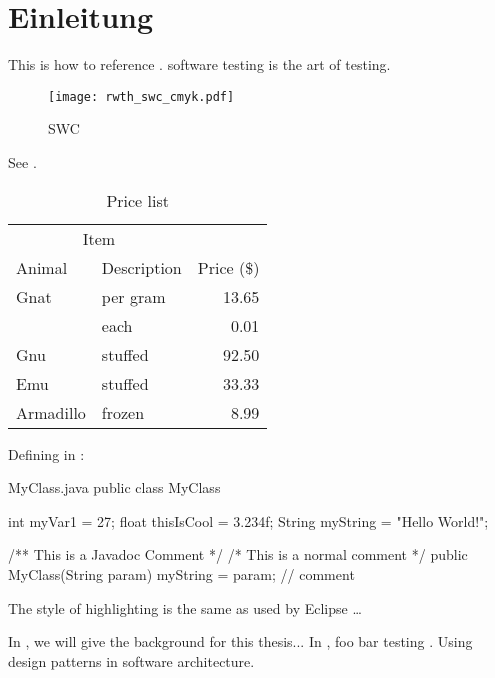 
\chapter{Einleitung} \label{chap:Einleitung}
\minitoc\vspace{1em}
\blindtext

 This is how to reference . \gls{software testing} is the art of \gls{testing}.

\blindtext

\begin{figure}[ht]
  \centering
    \texttt{[image: rwth\_swc\_cmyk.pdf]}
  \caption{SWC} \label{fig:SWC}
\end{figure}

\Blindtext See . 

\begin{table}
  \begin{center}
    \begin{tabular}{llr}
      \toprule
      \multicolumn{2}{c}{Item} \\
      \cmidrule(r){1-2}
      Animal & Description & Price (\$) \\
      \midrule
      Gnat      & per gram & 13.65 \\
                & each     &  0.01 \\
      Gnu       & stuffed  & 92.50 \\
      Emu       & stuffed  & 33.33 \\
      Armadillo & frozen   & 8.99  \\
      \bottomrule
    \end{tabular}
  \end{center}
  \caption{Price list} \label{tab:Price list}
\end{table}

\blindtext

Defining  in :

\begin{lstlistingJava}{MyClass.java}
public class MyClass {
    int    myVar1     = 27;
    float  thisIsCool = 3.234f;
    String myString   = "Hello World!";

    /** This is a Javadoc Comment */
    /* This is a normal comment */
    public MyClass(String param) {
        myString = param; // comment
    }
}
\end{lstlistingJava}

The style of highlighting is the same as used by Eclipse \cite{Eclipse} \ldots

In , we will give the background for this thesis... In , foo bar \gls{testing} \cite{ElectronicsEngingeers1990}. Using \gls{design pattern}s in \gls{software architecture}.
